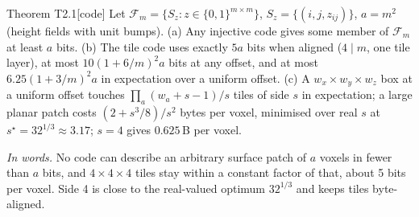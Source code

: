 \documentclass[11pt,a4paper]{article}
\begin{document}
\begin{result}{Theorem T2.1}[code]
Let $\mathcal F_m=\{S_z:z\in\{0,1\}^{m\times m}\}$, $S_z=\{(i,j,z_{ij})\}$, $a=m^2$ (height fields with unit bumps).
(a) Any injective code gives some member of $\mathcal F_m$ at least $a$ bits. (b) The tile code uses exactly $5a$ bits
when aligned ($4\mid m$, one tile layer), at most $10(1+6/m)^2a$ bits at any offset, and at most $6.25(1+3/m)^2a$ in
expectation over a uniform offset. (c) A $w_x\times w_y\times w_z$ box at a uniform offset touches
$\prod_a(w_a+s-1)/s$ tiles of side $s$ in expectation; a large planar patch costs $(2+s^3/8)/s^2$ bytes per voxel,
minimised over real $s$ at $s^\star=32^{1/3}\approx3.17$; $s=4$ gives $0.625$\,B per voxel.
\end{result}
\noindent\emph{In words.} No code can describe an arbitrary surface patch of $a$ voxels in fewer than $a$ bits, and $4\times4\times4$ tiles stay within a constant factor of that, about 5 bits per voxel. Side 4 is close to the real-valued optimum $32^{1/3}$ and keeps tiles byte-aligned.
\end{document}
